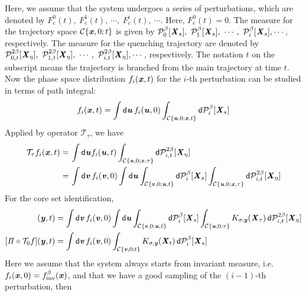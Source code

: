 \documentclass[aip,jcp,a4paper,reprint,onecolumn]{revtex4-1}
\newcommand{\vect}[1]{\textbf{\textit{#1}}}
\newcommand{\dd}{\textsf{d}}
\newcommand{\inv}{\textrm{inv}}
\newcommand{\mt}{\mathcal T}
\newcommand{\mc}{\mathcal C}
\newcommand{\proj}{\mathit\Pi}
\begin{document}
Here, we assume that the system undergoes a series of perturbations,
which are denoted by $F^0_e(t),\ F^1_e(t),\ \cdots,\ F^i_e(t),\ \cdots$.
Here, $F^0_e(t) = 0$.
The measure for the trajectory space
$\mc\{\vect x, 0; t\}$
is given by
$\mathcal P_0^\beta[\vect X_s],\ \mathcal P_1^\beta[\vect X_s],\ \cdots,\
\mathcal P_i^\beta[\vect X_s], \cdots$, respectively.
The measure for the quenching trajectory are denoted by
$\mathcal P_{0,t}^{2\beta}[\vect X_\eta],\
\mathcal P_{1,t}^{2\beta}[\vect X_\eta],\ \cdots,\
\mathcal P_{i,t}^{2\beta}[\vect X_\eta], \cdots$, respectively.
The notation $t$ on the subscript means the trajectory is branched from
the main trajectory at time $t$.
Now the phase space distribution $f_i(\vect x, t)$ for the
$i$-th perturbation can be studied in terms
of path integral:
\begin{align}
  f_i(\vect x, t) =
  \int\dd\vect u\,
  f_i(\vect u, 0)
  \int_{\mc\{\vect u,0; \vect x,t\}}
  \dd\mathcal P_i^\beta[\vect X_s]
\end{align}
Applied by operator $\mt_\tau$, we have
\begin{align}\nonumber
  \mt_\tau f_i(\vect x, t)
  =&\,
  \int\dd\vect u f_i(\vect u, t)
  \int_{\mc\{\vect u,0; \vect x,\tau\}}
  \dd\mathcal P_{i,t}^{2\beta}[\vect X_\eta]\\
  =&\,
  \int\dd\vect v\,
  f_i(\vect v, 0)
  \int\dd\vect u
  \int_{\mc\{\vect v,0; \vect u,t\}}
  \dd\mathcal P_i^\beta[\vect X_s]  
  \int_{\mc\{\vect u,0; \vect x,\tau\}}
  \dd\mathcal P_{i,t}^{2\beta}[\vect X_\eta]
\end{align}
For the core set identification,
\begin{align}
  [\proj\circ\mt_\tau f](\vect y, t)
  &=
  \int\dd\vect v\,
  f_i(\vect v, 0)
  \int\dd\vect u
  \int_{\mc\{\vect v,0; \vect u,t\}}
  \dd\mathcal P_i^\beta[\vect X_s]  
  \int_{\mc\{\vect u,0; \tau\}}
  K_{\sigma,\vect y}(\vect X_\tau)\,
  \dd\mathcal P_{i,t}^{2\beta}[\vect X_\eta]  \\
  [\proj\circ\mt_0 f](\vect y, t)
  &=
  \int\dd\vect v\,
  f_i(\vect v, 0)
  \int_{\mc\{\vect v,0; t\}}
  K_{\sigma,\vect y}(\vect X_t)\,
  \dd\mathcal P_i^\beta[\vect X_s]  
\end{align}
Here we assume that the system always starts from invariant measure,
i.e. $f_i(\vect x, 0) = f_{\inv}^\beta(\vect x)$, and that we have a
good sampling of the $(i-1)$-th perturbation, then
\end{document}
